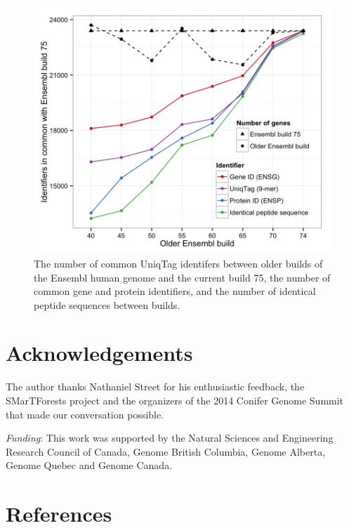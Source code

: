 \documentclass{bioinfo}
\begin{document}
\begin{figure}[htbp]
\centering
\includegraphics{ensembl.png}
\caption{The number of common UniqTag identifers between older builds of
the Ensembl human genome and the current build 75, the number of common
gene and protein identifiers, and the number of identical peptide
sequences between builds.}
\end{figure}

\section*{Acknowledgements}\label{acknowledgements}

The author thanks Nathaniel Street for his enthusiastic feedback, the
SMarTForests project and the organizers of the 2014 Conifer Genome
Summit that made our conversation possible.

\emph{Funding}: This work was supported by the Natural Sciences and
Engineering Research Council of Canada, Genome British Columbia, Genome
Alberta, Genome Quebec and Genome Canada.

\section*{References}\label{references}
\end{document}
